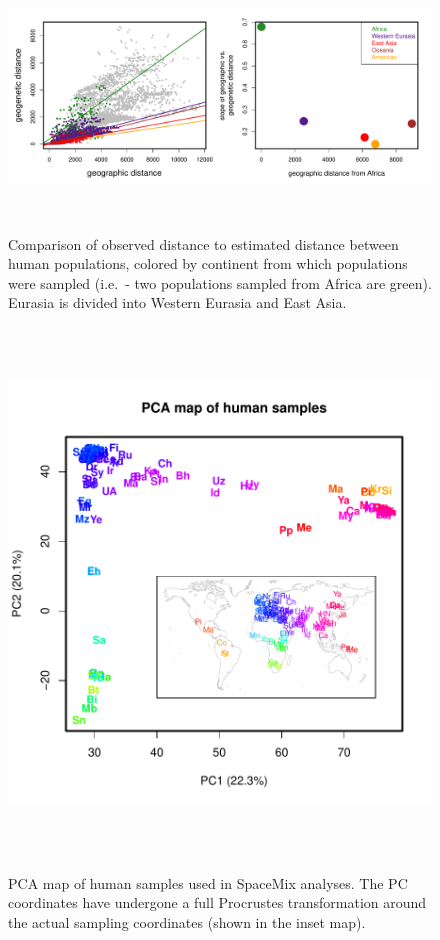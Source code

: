 \documentclass[12pt]{article}
\begin{document}
\clearpage

\begin{figure}
	\centering
		{\includegraphics[width=6in,height=2.5in]{figs/globetrotter/globe_NoAd_dist_decay.pdf}}
	\caption{Comparison of observed distance to estimated distance between human populations, colored by continent from which populations were sampled (i.e.\ - two populations sampled from Africa are green).  Eurasia is divided into Western Eurasia and East Asia.}
\label{sfig:globe_noad_distcomp}
\end{figure}

\clearpage

\begin{figure}
	\centering
		{\includegraphics[width=5.5in,height=5.5in]{figs/globetrotter/globe_PCA_map.pdf}}
	\caption{PCA map of human samples used in SpaceMix analyses.  The PC coordinates have undergone a full Procrustes transformation around the actual sampling coordinates (shown in the inset map).}
\label{sfig:globe_PCA_map}
\end{figure}
\end{document}
